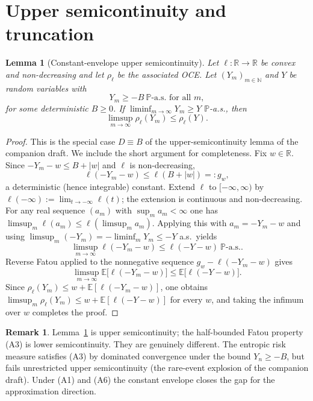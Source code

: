 \documentclass[11pt,a4paper]{report}
\numberwithin{equation}{chapter}
\theoremstyle{plain}
\newtheorem{lemma}[proposition]{Lemma}
\theoremstyle{definition}
\newtheorem{remark}[proposition]{Remark}
\newcommand{\E}{\mathbb{E}}
\newcommand{\PP}{\mathbb{P}}
\newcommand{\R}{\mathbb{R}}
\newcommand{\N}{\mathbb{N}}
\newcommand{\as}{\ \PP\text{-a.s.}}
\begin{document}
\section{Upper semicontinuity and truncation}\label{sec:tools-A}

\begin{lemma}[Constant-envelope upper semicontinuity]\label{lem:usc-A}
    Let $\ell\colon\R\to\R$ be convex and non-decreasing and let $\rho_\ell$ be the associated OCE. Let $(Y_m)_{m\in\N}$ and $Y$ be random variables with
    \[
        Y_m\ge-B\as\text{ for all }m,
    \]
    for some deterministic $B\ge0$. If $\liminf_{m\to\infty}Y_m\ge Y$ $\PP$-a.s., then
    \[
        \limsup_{m\to\infty}\rho_\ell(Y_m)\le\rho_\ell(Y).
    \]
\end{lemma}

\begin{proof}
    This is the special case $D\equiv B$ of the upper-semicontinuity lemma of the companion draft. We include the short argument for completeness. Fix $w\in\R$. Since $-Y_m-w\le B+|w|$ and $\ell$ is non-decreasing,
    \[
        \ell(-Y_m-w)\le\ell(B+|w|)=:g_w,
    \]
    a deterministic (hence integrable) constant. Extend $\ell$ to $[-\infty,\infty)$ by $\ell(-\infty):=\lim_{t\to-\infty}\ell(t)$; the extension is continuous and non-decreasing. For any real sequence $(a_m)$ with $\sup_m a_m<\infty$ one has $\limsup_m\ell(a_m)\le\ell(\limsup_m a_m)$. Applying this with $a_m=-Y_m-w$ and using $\limsup_m(-Y_m)=-\liminf_m Y_m\le-Y$ a.s.\ yields
    \[
        \limsup_{m\to\infty}\ell(-Y_m-w)\le\ell(-Y-w)\as.
    \]
    Reverse Fatou applied to the nonnegative sequence $g_w-\ell(-Y_m-w)$ gives
    \[
        \limsup_{m\to\infty}\E\bigl[\ell(-Y_m-w)\bigr]\le\E\bigl[\ell(-Y-w)\bigr].
    \]
    Since $\rho_\ell(Y_m)\le w+\E[\ell(-Y_m-w)]$, one obtains $\limsup_m\rho_\ell(Y_m)\le w+\E[\ell(-Y-w)]$ for every $w$, and taking the infimum over $w$ completes the proof.
\end{proof}

\begin{remark}\label{rem:usc-vs-A3}
    Lemma~\ref{lem:usc-A} is upper semicontinuity; the half-bounded Fatou property (A3) is lower semicontinuity. They are genuinely different. The entropic risk measure satisfies (A3) by dominated convergence under the bound $Y_n\ge-B$, but fails unrestricted upper semicontinuity (the rare-event explosion of the companion draft). Under (A1) and (A6) the constant envelope closes the gap for the approximation direction.
\end{remark}
\end{document}
